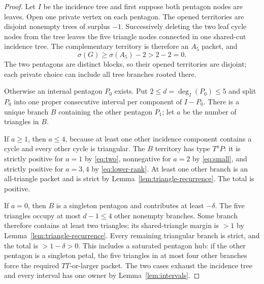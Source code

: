 \documentclass[11pt]{article}
\newcommand{\sig}{\sigma}
\begin{document}
\begin{proof}
Let $I$ be the incidence tree and first suppose both pentagon nodes are leaves.
Open one private vertex on each pentagon.  The opened territories are disjoint
nonempty trees of surplus $-1$.  Successively deleting the two leaf cycle nodes
from the tree leaves the five triangle nodes connected in one shared-cut
incidence tree.  The complementary territory is therefore an $A_5$ packet,
and
\[
 \sig(G)\geq\sig(A_5)-2>2-2=0.
\]
The two pentagons are distinct blocks, so their opened territories are
disjoint; each private choice can include all tree branches rooted there.

Otherwise an internal pentagon $P_0$ exists.  Put
$2\leq d=\deg_I(P_0)\leq5$ and split $P_0$ into one proper consecutive
interval per component of $I-P_0$.  There is a unique branch $B$ containing
the other pentagon $P_1$; let $a$ be the number of triangles in $B$.

If $a\geq1$, then $a\leq4$, because at least one other incidence component
contains a cycle and every other cycle is triangular.  The $B$ territory has
type $T^aP$: it is strictly positive for $a=1$ by \eqref{eq:two}, nonnegative
for $a=2$ by \eqref{eq:small}, and strictly positive for $a=3,4$ by
\eqref{eq:lower-rank}.  At least one other branch is an all-triangle packet and
is strict by Lemma~\ref{lem:triangle-recurrence}.  The total is positive.

If $a=0$, then $B$ is a singleton pentagon and contributes at least $-\delta$.
The five triangles occupy at most $d-1\leq4$ other nonempty branches.  Some
branch therefore contains at least two triangles; its shared-triangle margin is
$>1$ by Lemma~\ref{lem:triangle-recurrence}.  Every remaining triangular
branch is strict, and the total is $>1-\delta>0$.  This includes a saturated
pentagon hub: if the other pentagon is a singleton petal, the five triangles in
at most four other branches force the required $TT$-or-larger packet.  The two
cases exhaust the incidence tree and every interval has one owner by
Lemma~\ref{lem:intervals}.
\end{proof}
\end{document}
